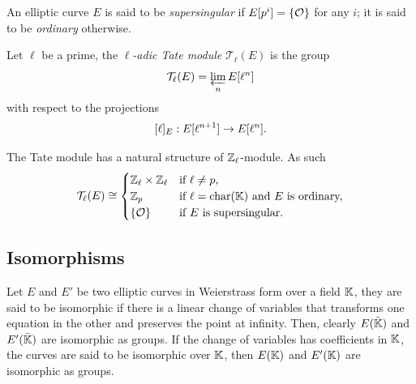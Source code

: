 \begin{definition}
  An elliptic curve $E$ is said to be
  \emph{supersingular}
  if $E[p^i]=\{\mathcal{O}\}$ for any $i$; it is said to be
  \emph{ordinary} otherwise.
\end{definition}

\begin{definition}
  Let $\ell$ be a prime, the \emph{$\ell$-adic Tate
    module}
  $\mathcal{T}_\ell(E)$ is the group
  \begin{equation}
    \label{eq:132}
    \mathcal{T}_\ell(E) = \varprojlim_n E[\ell^n]
  \end{equation}
  with respect to the projections
  \begin{equation}
    \label{eq:133}
    [\ell]_E : E[\ell^{n+1}] \rightarrow E[\ell^{n}]
    \text{.}
  \end{equation}
\end{definition}

\begin{proposition}
  The Tate module has a natural structure of
  $\mathbb{Z}_\ell$-module. As
  such
  \begin{equation}
    \label{eq:134}
    \mathcal{T}_\ell(E) \cong
    \begin{cases}
      \mathbb{Z}_\ell\times\mathbb{Z}_\ell &\text{if $\ell\ne p$,}\\
      \mathbb{Z}_p &\text{if $\ell=\operatorname{char}(\mathbb{K})$ and $E$ is ordinary,}\\
      \{\mathcal{O}\} &\text{if $E$ is supersingular.}
    \end{cases}
  \end{equation}
\end{proposition}


\subsection{Isomorphisms}
\label{sec:isomorphisms}

Let $E$ and $E'$ be two elliptic curves in Weierstrass form over a
field $\mathbb{K}$, they are said to be isomorphic if there is a linear change
of variables that transforms one equation in the other and preserves
the point at infinity.  Then, clearly $E(\bar{\mathbb{K}})$ and
$E'(\bar{\mathbb{K}})$ are isomorphic as groups. If the change of variables
has coefficients in $\mathbb{K}$, the curves are said to be
isomorphic
over $\mathbb{K}$, then $E(\mathbb{K})$ and $E'(\mathbb{K})$ are isomorphic as groups.

